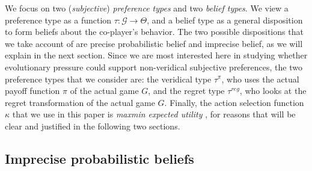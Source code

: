 \documentclass[fleqn,reqno,11pt]{article}
\begin{document}
We focus on two (\textit{subjective}) \emph{preference types} and two \emph{belief types}. We
view a preference type as a function $\tau: \mathcal{G} \rightarrow \Theta$, and a belief type
as a general disposition to form beliefs about the co-player’s behavior. The two possible
dispositions that we take account of are precise probabilistic belief and imprecise belief, as
we will explain in the next section. Since we are most interested here in studying whether
evolutionary pressure could support non-veridical subjective preferences, the two preference
types that we consider are: the veridical type $\tau^\pi$, who uses the actual payoff function
$\pi$ of the actual game $G$, and the regret type $\tau^{reg}$, who looks at the regret
transformation of the actual game $G$. Finally, the action selection function $\kappa$ that we
use in this paper is \textit{maxmin expected utility} \citep{gilsch89}, for reasons that will be clear
and justified in the following two sections.



\subsection{Imprecise probabilistic beliefs}
\label{sec:impr-prob-beli}
\end{document}
